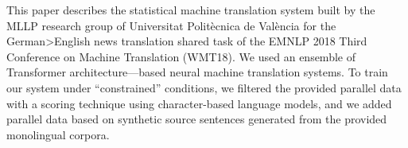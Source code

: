 This paper describes the statistical machine translation system built by the MLLP research group of Universitat Politècnica de València for the German>English news translation shared task of the EMNLP 2018 Third Conference on Machine Translation (WMT18). We used an ensemble of Transformer architecture---based neural machine translation systems. To train our system under ``constrained'' conditions, we filtered the provided parallel data with a scoring technique using character-based language models, and we added parallel data based on synthetic source sentences generated from the provided monolingual corpora.
